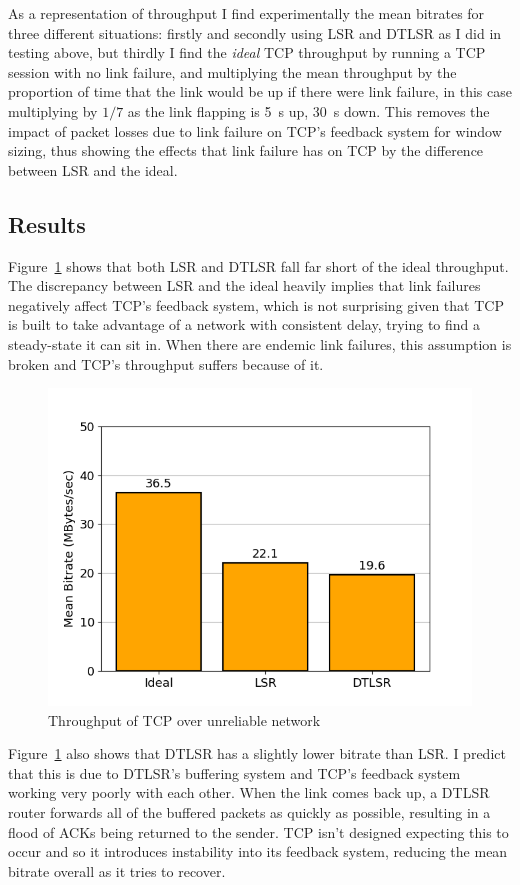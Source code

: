 \documentclass[withindex,glossary,openany]{cam-thesis}
\begin{document}
As a representation of throughput I find experimentally the mean bitrates for three different situations: firstly and secondly using LSR and DTLSR as I did in testing above, but thirdly I find the \textit{ideal} TCP throughput by running a TCP session with no link failure, and multiplying the mean throughput by the proportion of time that the link would be up if there were link failure, in this case multiplying by $1/7$ as the link flapping is \SI{5}{\s} up, \SI{30}{\s} down. This removes the impact of packet losses due to link failure on TCP's feedback system for window sizing, thus showing the effects that link failure has on TCP by the difference between LSR and the ideal.

\subsection{Results}

Figure~\ref{fig:tcp_5_30} shows that both LSR and DTLSR fall far short of the ideal throughput. The discrepancy between LSR and the ideal heavily implies that link failures negatively affect TCP's feedback system, which is not surprising given that TCP is built to take advantage of a network with consistent delay, trying to find a steady-state it can sit in. When there are endemic link failures, this assumption is broken and TCP's throughput suffers because of it.

\begin{figure}[H]
  \centering
  \includegraphics[width=0.8\linewidth]{tcp_bar_flap5_30}
  \caption{Throughput of TCP over unreliable network}
  \label{fig:tcp_5_30}
\end{figure}

Figure~\ref{fig:tcp_5_30} also shows that DTLSR has a slightly lower bitrate than LSR. I predict that this is due to DTLSR's buffering system and TCP's feedback system working very poorly with each other. When the link comes back up, a DTLSR router forwards all of the buffered packets as quickly as possible, resulting in a flood of ACKs being returned to the sender. TCP isn't designed expecting this to occur and so it introduces instability into its feedback system, reducing the mean bitrate overall as it tries to recover.
\end{document}
